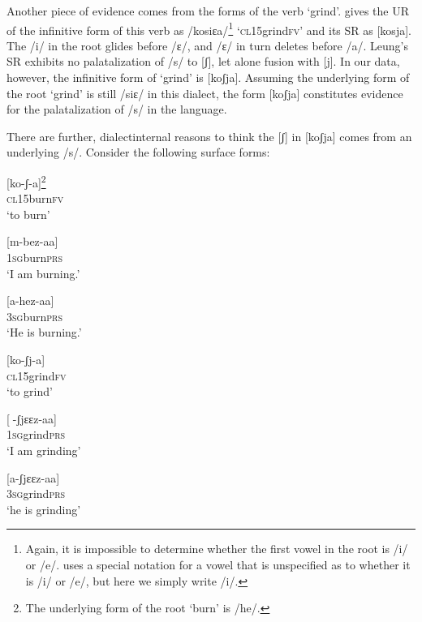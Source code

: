 \documentclass[output=paper]{langsci/langscibook}
\begin{document}
Another piece of evidence comes from the forms of the verb ‘grind’. \citet{Leung1991} gives the UR of the infinitive form of this verb as /kosiɛa/\footnote{Again, it is impossible to determine whether the first vowel in the root is /i/ or /e/. \citet{Leung1991} uses a special notation for a vowel that is unspecified as to whether it is /i/ or /e/, but here we simply write /i/.}  ‘\textsc{cl}15grind\textsc{fv}’ and its SR as [kosja]. The /i/ in the root glides before /ɛ/, and /ɛ/ in turn deletes before /a/. Leung’s SR exhibits no palatalization of /s/ to [ʃ], let alone fusion with [j]. In our data, however, the infinitive form of ‘grind’ is [koʃja]. Assuming the underlying form of the root ‘grind’ is still /siɛ/ in this dialect, the form [koʃja] constitutes evidence for the palatalization of /s/ in the language. 

There are further, dialectinternal reasons to think the [ʃ] in [koʃja] comes from an underlying /s/. Consider the following surface forms:

\ea{}
 [ko-ʃ{}-a]\footnote{The underlying form of the root ‘burn’ is /he/.} \\{}
\textsc{cl15}burn\textsc{fv}\\{}
\glt ‘to burn’
\z


\ea{}
 [m-bez-aa]\\{}
\textsc{1sg}burn\textsc{prs}\\{}
\glt ‘I am burning.’
\z


\ea{}
 [a-hez-aa]\\{}
\textsc{3sg}burn\textsc{prs}\\{}
\glt ‘He is burning.’
\z


\ea{}
 [ko-ʃj-a]\\{}
\textsc{cl15}grind\textsc{fv}\\{}
\glt ‘to grind’
\z


\ea{}
 [-ʃjɛɛz-aa]\\{}
\textsc{1sg}grind\textsc{prs}\\{}
\glt ‘I am grinding’
\z


\ea{}
 [a-ʃjɛɛz-aa]\\{}
\textsc{3sg}grind\textsc{prs}\\{}
\glt ‘he is grinding’
\z
\end{document}
